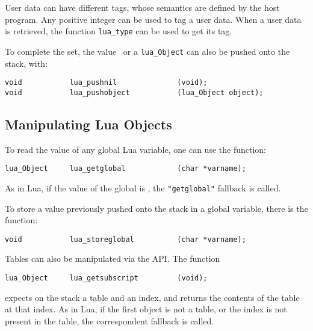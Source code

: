 User data can have different tags,
whose semantics are defined by the host program.
Any positive integer can be used to tag a user data.
When a user data is retrieved,
the function \verb'lua_type' can be used to get its tag.

To complete the set,
the value \nil\ or a \verb'lua_Object' can also be pushed onto the stack,
with:
\begin{verbatim}
void           lua_pushnil              (void);
void           lua_pushobject           (lua_Object object);
\end{verbatim}


\subsection{Manipulating Lua Objects}
To read the value of any global Lua variable,
one can use the function:
\begin{verbatim}
lua_Object     lua_getglobal            (char *varname);
\end{verbatim}
As in Lua, if the value of the global is \nil,
the \verb'"getglobal"' fallback is called.

To store a value previously pushed onto the stack in a global variable,
there is the function:
\begin{verbatim}
void           lua_storeglobal          (char *varname);
\end{verbatim}

Tables can also be manipulated via the API.
The function
\begin{verbatim}
lua_Object     lua_getsubscript         (void);
\end{verbatim}
expects on the stack a table and an index,
and returns the contents of the table at that index.
As in Lua, if the first object is not a table,
or the index is not present in the table,
the correspondent fallback is called.


